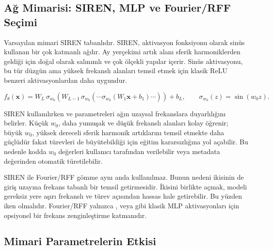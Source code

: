 \subsection{Ağ Mimarisi: SIREN, MLP ve Fourier/RFF Seçimi}

Varsayılan mimari SIREN tabanlıdır. SIREN, aktivasyon fonksiyonu olarak sinüs kullanan bir çok katmanlı ağdır. Ay yerçekimi artık alanı sferik harmoniklerden geldiği için doğal olarak salınımlı ve çok ölçekli yapılar içerir. Sinüs aktivasyonu, bu tür düzgün ama yüksek frekanslı alanları temsil etmek için klasik ReLU benzeri aktivasyonlardan daha uygundur.

\[
f_{\theta}(\mathbf{x})
=
W_L \,\sigma_{w_0}\!\left(
W_{L-1}\,\sigma_{w_0}(\cdots \sigma_{w_0}(W_1\mathbf{x}+b_1)\cdots)
\right)+b_L,
\qquad
\sigma_{w_0}(z)=\sin(w_0 z).
\]

SIREN kullanılırken  ve  parametreleri ağın uzaysal frekanslara duyarlılığını belirler. Küçük \(w_0\), daha yumuşak ve düşük frekanslı alanları kolay öğrenir; büyük \(w_0\), yüksek dereceli sferik harmonik artıklarını temsil etmekte daha güçlüdür fakat türevleri de büyütebildiği için eğitim kararsızlığına yol açabilir. Bu nedenle kodda \(w_0\) değerleri kullanıcı tarafından verilebilir veya  metadata değerinden otomatik türetilebilir.

SIREN ile Fourier/RFF gömme aynı anda kullanılmaz. Bunun nedeni ikisinin de giriş uzayına frekans tabanlı bir temsil getirmesidir. İkisini birlikte açmak, modeli gereksiz yere aşırı frekanslı ve türev açısından hassas hale getirebilir. Bu yüzden  iken  olmalıdır. Fourier/RFF yalnızca ,  veya  gibi klasik MLP aktivasyonları için opsiyonel bir frekans zenginleştirme katmanıdır.

\subsection{Mimari Parametrelerin Etkisi}

